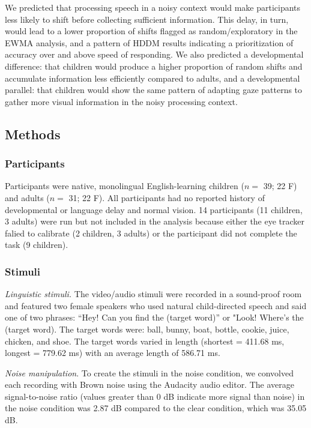 \documentclass[english,floatsintext,man]{apa6}
\begin{document}
We predicted that processing speech in a noisy context would make
participants less likely to shift before collecting sufficient
information. This delay, in turn, would lead to a lower proportion of
shifts flagged as random/exploratory in the EWMA analysis, and a pattern
of HDDM results indicating a prioritization of accuracy over and above
speed of responding. We also predicted a developmental difference: that
children would produce a higher proportion of random shifts and
accumulate information less efficiently compared to adults, and a
developmental parallel: that children would show the same pattern of
adapting gaze patterns to gather more visual information in the noisy
processing context.

\hypertarget{methods-1}{%
\subsection{Methods}\label{methods-1}}

\hypertarget{participants-1}{%
\subsubsection{Participants}\label{participants-1}}

Participants were native, monolingual English-learning children (\(n=\)
39; 22 F) and adults (\(n=\) 31; 22 F). All participants had no reported
history of developmental or language delay and normal vision. 14
participants (11 children, 3 adults) were run but not included in the
analysis because either the eye tracker falied to calibrate (2 children,
3 adults) or the participant did not complete the task (9 children).

\hypertarget{stimuli-1}{%
\subsubsection{Stimuli}\label{stimuli-1}}

\emph{Linguistic stimuli.} The video/audio stimuli were recorded in a
sound-proof room and featured two female speakers who used natural
child-directed speech and said one of two phrases: \enquote{Hey! Can you
find the (target word)} or "Look! Where's the (target word). The target
words were: ball, bunny, boat, bottle, cookie, juice, chicken, and shoe.
The target words varied in length (shortest = 411.68 ms, longest =
779.62 ms) with an average length of 586.71 ms.

\emph{Noise manipulation}. To create the stimuli in the noise condition,
we convolved each recording with Brown noise using the Audacity audio
editor. The average signal-to-noise ratio (values greater than 0 dB
indicate more signal than noise) in the noise condition was 2.87 dB
compared to the clear condition, which was 35.05 dB.
\end{document}
